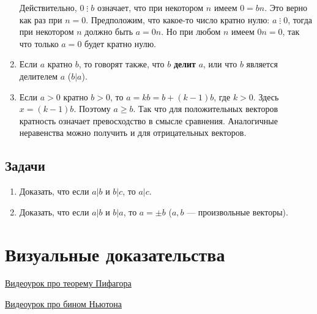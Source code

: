 \begin{enumerate}
Действительно, $0\mathop{\vdots} b$ означает, что при некотором $n$ имеем $0=bn$. Это верно как раз при $n=0$. Предположим, что какое-то число кратно нулю: $a\mathop{\vdots} 0$, тогда при некотором $n$ должно быть $a=0n$. Но при любом $n$ имеем $0n=0$, так что только $a=0$ будет кратно нулю.

\item Если $a$ кратно $b$, то говорят также, что $b$ \textbf{делит} $a$, или что $b$ является делителем $a$ ($b|a$).
\item Если $a>0$ кратно $b>0$, то $a=kb=b+(k-1)b$, где $k>0$. Здесь $x=(k-1)b$. Поэтому $a\ge b$. Так что для положительных векторов кратность означает превосходство в смысле сравнения. Аналогичные неравенства можно получить и для отрицательных векторов.
\end{enumerate}
\subsection*{Задачи}
\begin{enumerate}
\item Доказать, что если $a|b$ и $b|c$, то $a|c$.
\item Доказать, что если $a|b$ и $b|a$, то $a=\pm b$ ($a,b$ --- произвольные векторы).
\end{enumerate}


\section{Визуальные доказательства}\label{vizual}

\href{https://www.youtube.com/watch?v=Xdc8WWFURA8}{Видеоурок про теорему Пифагора}

\href{https://www.youtube.com/watch?v=YXYQmxLDtMw}{Видеоурок про бином Ньютона}


